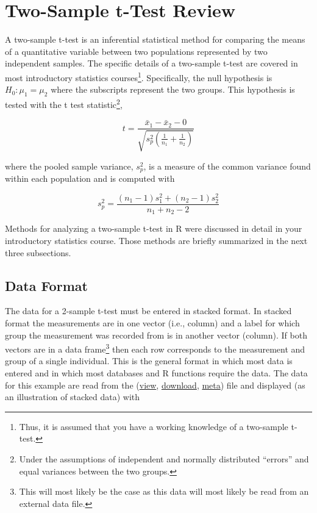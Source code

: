 \documentclass[10pt,openany]{book}\usepackage[]{graphicx}\usepackage[]{color}
\begin{document}
\section{Two-Sample t-Test Review} \label{sect:2tTest}
A two-sample t-test is an inferential statistical method for comparing the means of a quantitative variable between two populations represented by two independent samples.  The specific details of a two-sample t-test are covered in most introductory statistics courses\footnote{Thus, it is assumed that you have a working knowledge of a two-sample t-test.}.  Specifically, the null hypothesis is $H_{0}:\mu_{1}=\mu_{2}$ where the subscripts represent the two groups.  This hypothesis is tested with the t test statistic\footnote{Under the assumptions of independent and normally distributed ``errors'' and equal variances between the two groups.},

\begin{equation} \label{eqn:2tTestStat}
   t=\frac{\bar{x}_{1}-\bar{x}_{2}-0}{\sqrt{s_{p}^{2}\left(\frac{1}{n_{1}}+\frac{1}{n_{2}} \right)}}
\end{equation}

where the pooled sample variance, $s_{p}^{2}$, is a measure of the common variance found within each population and is computed with

\[ s_{p}^{2}=\frac{(n_{1}-1)s_{1}^{2}+(n_{2}-1)s_{2}^{2}}{n_{1}+n_{2}-2} \]

Methods for analyzing a two-sample t-test in R were discussed in detail in your introductory statistics course.  Those methods are briefly summarized in the next three subsections.

\subsection{Data Format} \label{sect:DataStacked}
The data for a 2-sample t-test must be entered in stacked format.  In stacked format the measurements are in one vector (i.e., column) and a label for which group the measurement was recorded from is in another vector (column).  If both vectors are in a data frame\footnote{This will most likely be the case as this data will most likely be read from an external data file.} then each row corresponds to the measurement and group of a single individual.  This is the general format in which most data is entered and in which most databases and R functions require the data.  The data for this example are read from the  (\href{https://github.com/droglenc/NCData/blob/master/BOD.csv}{view}, \href{https://raw.githubusercontent.com/droglenc/NCData/master/BOD.csv}{download}, \href{https://github.com/droglenc/NCData/blob/master/BOD_meta.txt}{meta}) file and displayed (as an illustration of stacked data) with
\end{document}
